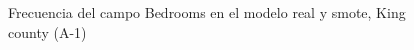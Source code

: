 \begin{figure}[H]
    \centering
    
    \caption{Frecuencia del campo Bedrooms en el modelo real y smote, King county (A-1)}
    \label{frecuency-smote-bedrooms}
\end{figure}